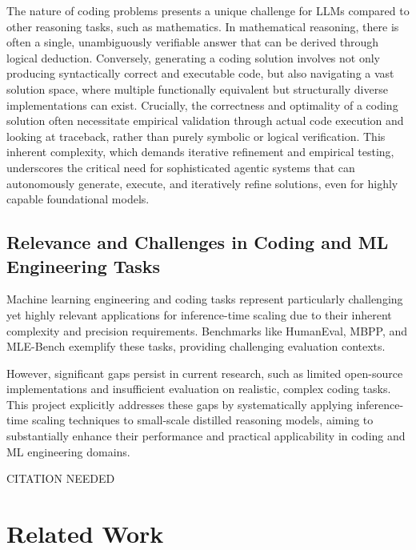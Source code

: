 The nature of coding problems presents a unique challenge for LLMs compared to other reasoning tasks, such as mathematics. In mathematical reasoning, there is often a single, unambiguously verifiable answer that can be derived through logical deduction. Conversely, generating a coding solution involves not only producing syntactically correct and executable code, but also navigating a vast solution space, where multiple functionally equivalent but structurally diverse implementations can exist. Crucially, the correctness and optimality of a coding solution often necessitate empirical validation through actual code execution and looking at traceback, rather than purely symbolic or logical verification. This inherent complexity, which demands iterative refinement and empirical testing, underscores the critical need for sophisticated agentic systems that can autonomously generate, execute, and iteratively refine solutions, even for highly capable foundational models.

\subsection{Relevance and Challenges in Coding and ML Engineering Tasks}
Machine learning engineering and coding tasks represent particularly challenging yet highly relevant applications for inference-time scaling due to their inherent complexity and precision requirements. Benchmarks like HumanEval, MBPP, and MLE-Bench exemplify these tasks, providing challenging evaluation contexts.

However, significant gaps persist in current research, such as limited open-source implementations and insufficient evaluation on realistic, complex coding tasks. This project explicitly addresses these gaps by systematically applying inference-time scaling techniques to small-scale distilled reasoning models, aiming to substantially enhance their performance and practical applicability in coding and ML engineering domains.

CITATION NEEDED
\section{Related Work}
 


